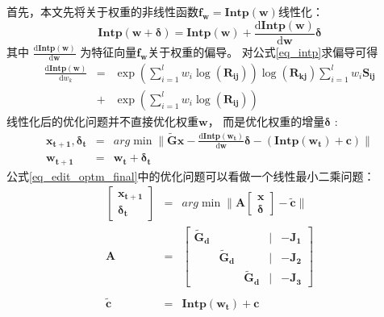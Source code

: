 首先，本文先将关于权重的非线性函数$\bm{f_w}=\bm{Intp}(\bm{w})$线性化：
\begin{equation}
    \bm{Intp}(\bm{w}+\bm{\delta})
    =
        \bm{Intp}(\bm{w})
        +
        \frac
            {\mathrm{d} \bm{Intp}(\bm{w})}
            {\mathrm{d} \bm{w}} 
        \bm{\delta}
\end{equation}
其中
$
\frac
    {\mathrm{d} \bm{Intp}(\bm{w})}
    {\mathrm{d} \bm{w}} 
$
为特征向量$\bm{f_w}$关于权重的偏导。
对公式\ref{eq_intp}求偏导可得
\begin{eqnarray}
    \frac
        {\mathrm{d} \bm{Intp}(\bm{w})}
        {\mathrm{d} w_k}
    &=&
    \exp (\sum_{i=1}^{l}w_i\log(\bm{R_{ij}}))
    \log(\bm{R_{kj}})\sum_{i=1}^{l}w_i\bm{S_{ij}} \nonumber \\
    &+&
    \exp(\sum_{i=1}^{l}w_i\log(\bm{R_{ij}}))
\end{eqnarray}
线性化后的优化问题并不直接优化权重$\bm{w}$，
而是优化权重的增量$\bm{\delta}$
:
\begin{eqnarray}
    \label{eq_edit_optm_final}
    \bm{x_{t+1}},\bm{\delta_t}
    &=&
    arg \min
    \|
    \widetilde{\bm{G}}\bm{x}
        -
        \frac
            {\mathrm{d} \bm{Intp}(\bm{w_t})}
            {\mathrm{d} \bm{w}} 
        \bm{\delta}
        -
        (
            \bm{Intp}(\bm{w_t})
            +
            \bm{c}
        )
    \|
    \nonumber \\
    \bm{w_{t+1}}
    &=&
    \bm{w_t}+\bm{\delta_t}
\end{eqnarray}
公式\ref{eq_edit_optm_final}中的优化问题可以看做一个线性最小二乘问题：
\begin{eqnarray}
    \label{eq_edit_optm_final}
    \begin{bmatrix}
        \bm{x_{t+1}}\\
        \bm{\delta_t}
    \end{bmatrix}
    &=&
    arg \min
    \|
        \bm{A}
        \begin{bmatrix}
            \bm{x}\\
            \bm{\delta}
        \end{bmatrix}
        -
        \widetilde{\bm{c}}
    \|
    \nonumber \\
    \bm{A}
    &=&
    \begin{bmatrix}
        \bm{\widetilde{G}_d} &        &                     &|&   -\bm{J_1}\\ 
         &       \bm{\widetilde{G}_d} &                     &|&   -\bm{J_2}\\ 
         &       &                  \bm{\widetilde{G}_d}    &|&   -\bm{J_3}
    \end{bmatrix}\\
    \nonumber \\
    \widetilde{\bm{c}}
    &=&
    \bm{Intp}(\bm{w_t})
    +
    \bm{c}
\end{eqnarray}
